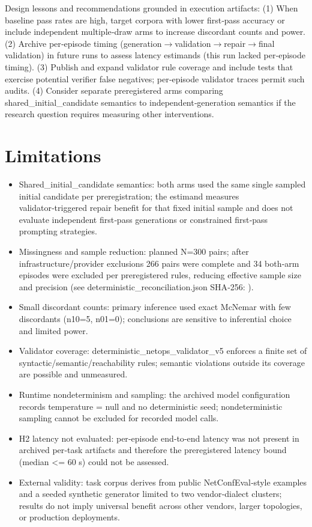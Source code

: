 \documentclass[conference]{IEEEtran}
\begin{document}
Design lessons and recommendations grounded in execution artifacts: (1) When baseline pass rates are high, target corpora with lower first‑pass accuracy or include independent multiple‑draw arms to increase discordant counts and power. (2) Archive per‑episode timing (generation\ensuremath{\rightarrow}validation\ensuremath{\rightarrow}repair\ensuremath{\rightarrow}final validation) in future runs to assess latency estimands (this run lacked per‑episode timing). (3) Publish and expand validator rule coverage and include tests that exercise potential verifier false negatives; per‑episode validator traces permit such audits. (4) Consider separate preregistered arms comparing shared\_initial\_candidate semantics to independent‑generation semantics if the research question requires measuring other interventions.

\section{Limitations}
\begin{itemize}
\item Shared\_initial\_candidate semantics: both arms used the same single sampled initial candidate per preregistration; the estimand measures validator‑triggered repair benefit for that fixed initial sample and does not evaluate independent first‑pass generations or constrained first‑pass prompting strategies.
\item Missingness and sample reduction: planned N=300 pairs; after infrastructure/provider exclusions 266 pairs were complete and 34 both‑arm episodes were excluded per preregistered rules, reducing effective sample size and precision (see deterministic\_reconciliation.json SHA‑256: ).
\item Small discordant counts: primary inference used exact McNemar with few discordants (n10=5, n01=0); conclusions are sensitive to inferential choice and limited power.
\item Validator coverage: deterministic\_netops\_validator\_v5 enforces a finite set of syntactic/semantic/reachability rules; semantic violations outside its coverage are possible and unmeasured.
\item Runtime nondeterminism and sampling: the archived model configuration records temperature = null and no deterministic seed; nondeterministic sampling cannot be excluded for recorded model calls.
\item H2 latency not evaluated: per‑episode end‑to‑end latency was not present in archived per‑task artifacts and therefore the preregistered latency bound (median <= 60 s) could not be assessed.
\item External validity: task corpus derives from public NetConfEval‑style examples and a seeded synthetic generator limited to two vendor‑dialect clusters; results do not imply universal benefit across other vendors, larger topologies, or production deployments.
\end{itemize}
\end{document}
